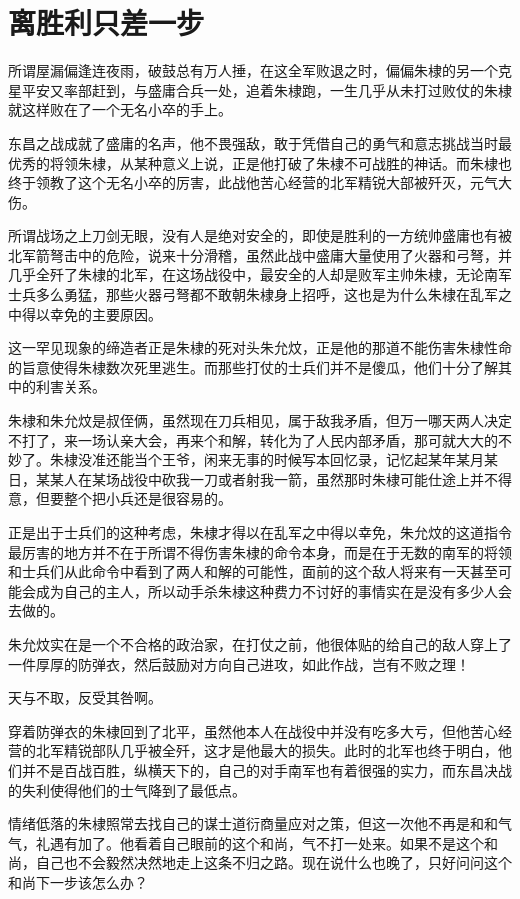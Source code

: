 \section{离胜利只差一步}
\ifnum{}
	\begin{multicols}{\theparacolNo}
		\fi
		所谓屋漏偏逢连夜雨，破鼓总有万人捶，在这全军败退之时，偏偏朱棣的另一个克星平安又率部赶到，与盛庸合兵一处，追着朱棣跑，一生几乎从未打过败仗的朱棣就这样败在了一个无名小卒的手上。

		东昌之战成就了盛庸的名声，他不畏强敌，敢于凭借自己的勇气和意志挑战当时最优秀的将领朱棣，从某种意义上说，正是他打破了朱棣不可战胜的神话。而朱棣也终于领教了这个无名小卒的厉害，此战他苦心经营的北军精锐大部被歼灭，元气大伤。

		所谓战场之上刀剑无眼，没有人是绝对安全的，即使是胜利的一方统帅盛庸也有被北军箭弩击中的危险，说来十分滑稽，虽然此战中盛庸大量使用了火器和弓弩，并几乎全歼了朱棣的北军，在这场战役中，最安全的人却是败军主帅朱棣，无论南军士兵多么勇猛，那些火器弓弩都不敢朝朱棣身上招呼，这也是为什么朱棣在乱军之中得以幸免的主要原因。

		这一罕见现象的缔造者正是朱棣的死对头朱允炆，正是他的那道不能伤害朱棣性命的旨意使得朱棣数次死里逃生。而那些打仗的士兵们并不是傻瓜，他们十分了解其中的利害关系。

		朱棣和朱允炆是叔侄俩，虽然现在刀兵相见，属于敌我矛盾，但万一哪天两人决定不打了，来一场认亲大会，再来个和解，转化为了人民内部矛盾，那可就大大的不妙了。朱棣没准还能当个王爷，闲来无事的时候写本回忆录，记忆起某年某月某日，某某人在某场战役中砍我一刀或者射我一箭，虽然那时朱棣可能仕途上并不得意，但要整个把小兵还是很容易的。

		正是出于士兵们的这种考虑，朱棣才得以在乱军之中得以幸免，朱允炆的这道指令最厉害的地方并不在于所谓不得伤害朱棣的命令本身，而是在于无数的南军的将领和士兵们从此命令中看到了两人和解的可能性，面前的这个敌人将来有一天甚至可能会成为自己的主人，所以动手杀朱棣这种费力不讨好的事情实在是没有多少人会去做的。

		朱允炆实在是一个不合格的政治家，在打仗之前，他很体贴的给自己的敌人穿上了一件厚厚的防弹衣，然后鼓励对方向自己进攻，如此作战，岂有不败之理！

		天与不取，反受其咎啊。

		穿着防弹衣的朱棣回到了北平，虽然他本人在战役中并没有吃多大亏，但他苦心经营的北军精锐部队几乎被全歼，这才是他最大的损失。此时的北军也终于明白，他们并不是百战百胜，纵横天下的，自己的对手南军也有着很强的实力，而东昌决战的失利使得他们的士气降到了最低点。

		情绪低落的朱棣照常去找自己的谋士道衍商量应对之策，但这一次他不再是和和气气，礼遇有加了。他看着自己眼前的这个和尚，气不打一处来。如果不是这个和尚，自己也不会毅然决然地走上这条不归之路。现在说什么也晚了，只好问问这个和尚下一步该怎么办？


\end{multicols}
